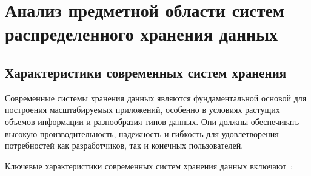 \section{Анализ предметной области систем распределенного хранения данных}

\subsection{Характеристики современных систем хранения}

Современные системы хранения данных являются фундаментальной основой для построения масштабируемых приложений, особенно в условиях растущих объемов информации и разнообразия типов данных. 
Они должны обеспечивать высокую производительность, надежность и гибкость для удовлетворения потребностей как разработчиков, так и конечных пользователей.

Ключевые характеристики современных систем хранения данных включают~\cite{systems}:

